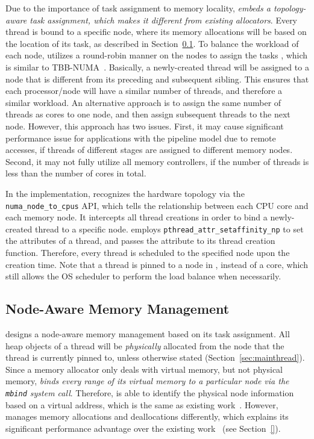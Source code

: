 Due to the importance of task assignment to  memory locality, \textit{\NA{} embeds a topology-aware task assignment, which makes it different from existing allocators}. Every thread is bound to a specific node, where its memory allocations will be based on the location of its task, as described in Section~\ref{sec:nodeaware-memory}. To balance the workload of each node, \NA{} utilizes a round-robin manner on the nodes to assign the tasks , which is similar to TBB-NUMA~\cite{Majo:2015:LPC:2688500.2688509}. Basically, a newly-created thread will be assigned to a node that is different from its preceding and subsequent sibling. This ensures that each processor/node will have a similar number of threads, and therefore a similar workload. An alternative approach is to assign the same number of threads as cores to one node, and then assign subsequent threads to the next node. However, this approach has two issues. First, it may cause significant performance issue for applications with the pipeline model due to remote accesses, if threads of different stages are assigned to different memory nodes. Second, it may not fully utilize all memory controllers, if the number of threads is less than the number of cores in total.    

In the implementation, \NA{} recognizes the hardware topology via the \texttt{numa\_node\_to\_cpus} API, which tells the relationship between each CPU core and each memory node. It intercepts all thread creations in order to bind a newly-created thread to a specific node. \NA{} employs \texttt{pthread\_attr\_setaffinity\_np} to set the attributes of a thread, and passes the attribute to its thread creation function. Therefore, every thread is scheduled to the specified node upon the creation time. Note that a thread is pinned to a node in \NM{}, instead of a core, which still allows the OS scheduler to perform the load balance when necessarily. 

\subsection{Node-Aware Memory Management} 
\label{sec:nodeaware-memory}

\NA{} designs a node-aware memory management based on its task assignment. All heap objects of a thread will be \textit{physically} allocated from the node that the thread is currently pinned to, unless otherwise stated (Section~\ref{sec:mainthread}). Since a memory allocator only deals with virtual memory, but not physical memory, \textit{\NA{} binds every range of its virtual memory to a particular node via the \texttt{mbind} system call}. Therefore, \NA{} is able to identify the physical node information based on a virtual address, which is the same as existing work~\cite{tcmallocnew}. However, \NA{} manages memory allocations and deallocations differently, which explains its significant performance advantage over the existing work~\cite{tcmallocnew} (see Section~\ref{}). 

